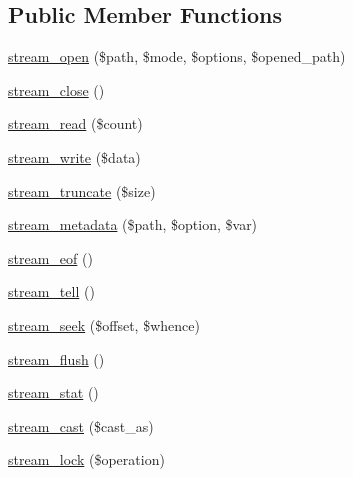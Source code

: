 \subsection*{Public Member Functions}
\begin{DoxyCompactItemize}
\item 
\mbox{\hyperlink{classorg_1_1bovigo_1_1vfs_1_1vfs_stream_wrapper_af9ec49fcc8889aefee3b186443a895ab}{stream\+\_\+open}} (\$path, \$mode, \$options, \$opened\+\_\+path)
\item 
\mbox{\hyperlink{classorg_1_1bovigo_1_1vfs_1_1vfs_stream_wrapper_af4c22f18f65f3a87da0abd141752a3f4}{stream\+\_\+close}} ()
\item 
\mbox{\hyperlink{classorg_1_1bovigo_1_1vfs_1_1vfs_stream_wrapper_acf4adec38e34adc3b8cdec2f6ddaf1df}{stream\+\_\+read}} (\$count)
\item 
\mbox{\hyperlink{classorg_1_1bovigo_1_1vfs_1_1vfs_stream_wrapper_a0f84598d2e48826e33d9c7de5364419a}{stream\+\_\+write}} (\$data)
\item 
\mbox{\hyperlink{classorg_1_1bovigo_1_1vfs_1_1vfs_stream_wrapper_a69a30efd8bd69f56da8297a819b4add5}{stream\+\_\+truncate}} (\$size)
\item 
\mbox{\hyperlink{classorg_1_1bovigo_1_1vfs_1_1vfs_stream_wrapper_a7eb65965e207cce9913bda3846e2a3ce}{stream\+\_\+metadata}} (\$path, \$option, \$var)
\item 
\mbox{\hyperlink{classorg_1_1bovigo_1_1vfs_1_1vfs_stream_wrapper_a3e9ce71f7c8ab0db36dfd38ea2039476}{stream\+\_\+eof}} ()
\item 
\mbox{\hyperlink{classorg_1_1bovigo_1_1vfs_1_1vfs_stream_wrapper_aa3320416e4520b888b7a9b0ce6508cd6}{stream\+\_\+tell}} ()
\item 
\mbox{\hyperlink{classorg_1_1bovigo_1_1vfs_1_1vfs_stream_wrapper_a11b8cbb2e2211df9c677df917afe092f}{stream\+\_\+seek}} (\$offset, \$whence)
\item 
\mbox{\hyperlink{classorg_1_1bovigo_1_1vfs_1_1vfs_stream_wrapper_a8bc9b070955b413c37b960e4bf0a73d2}{stream\+\_\+flush}} ()
\item 
\mbox{\hyperlink{classorg_1_1bovigo_1_1vfs_1_1vfs_stream_wrapper_ad5c2e5aede8f0bd6b523de4be61f169a}{stream\+\_\+stat}} ()
\item 
\mbox{\hyperlink{classorg_1_1bovigo_1_1vfs_1_1vfs_stream_wrapper_afd8c7ec563b853761ea7d3470d0bee73}{stream\+\_\+cast}} (\$cast\+\_\+as)
\item 
\mbox{\hyperlink{classorg_1_1bovigo_1_1vfs_1_1vfs_stream_wrapper_a9b45fe8e0c0ce5f58ecb0345851e0b25}{stream\+\_\+lock}} (\$operation)

\end{DoxyCompactItemize}
